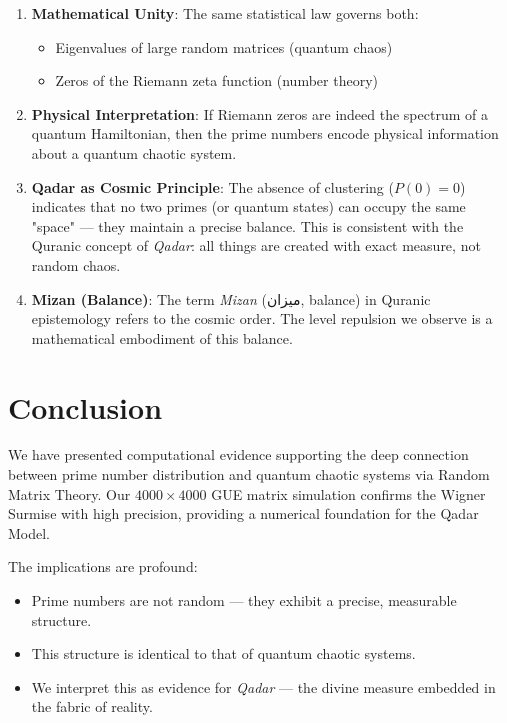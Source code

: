 \documentclass[12pt,a4paper]{article}
\begin{document}
\begin{enumerate}
    \item \textbf{Mathematical Unity}: The same statistical law governs both:
    \begin{itemize}
        \item Eigenvalues of large random matrices (quantum chaos)
        \item Zeros of the Riemann zeta function (number theory)
    \end{itemize}
    
    \item \textbf{Physical Interpretation}: If Riemann zeros are indeed the spectrum of a quantum Hamiltonian, then the prime numbers encode physical information about a quantum chaotic system.
    
    \item \textbf{Qadar as Cosmic Principle}: The absence of clustering ($P(0) = 0$) indicates that no two primes (or quantum states) can occupy the same "space" — they maintain a precise balance. This is consistent with the Quranic concept of \textit{Qadar}: all things are created with exact measure, not random chaos.
    
    \item \textbf{Mizan (Balance)}: The term \textit{Mizan} (ميزان, balance) in Quranic epistemology refers to the cosmic order. The level repulsion we observe is a mathematical embodiment of this balance.
\end{enumerate}

\section{Conclusion}

We have presented computational evidence supporting the deep connection between prime number distribution and quantum chaotic systems via Random Matrix Theory. Our $4000 \times 4000$ GUE matrix simulation confirms the Wigner Surmise with high precision, providing a numerical foundation for the Qadar Model.

The implications are profound:
\begin{itemize}
    \item Prime numbers are not random — they exhibit a precise, measurable structure.
    \item This structure is identical to that of quantum chaotic systems.
    \item We interpret this as evidence for \textit{Qadar} — the divine measure embedded in the fabric of reality.
\end{itemize}
\end{document}
